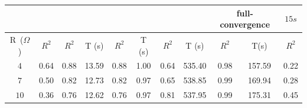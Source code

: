 \documentclass{article}
\begin{document}
\begin{table}[h!]
{\begin{tabular}{c | c | c  c | c  c | c  c | c c c}
\hline
& & & & & & & & \multicolumn{2}{c}{full-convergence} & $15s$ \\
\hline
R~($\Omega$) & $R^2$ & $R^2$ & T (s) & $R^2$ & T (s) & $R^2$ & T (s) & $R^2$ & T(s) & $R^2$ \\
\hline
$4$         &    0.64 &    0.88 & 13.59 &   0.88 & 1.00    & 0.64 & 535.40   &  0.98 & 157.59 & 0.22\\
$7$         &    0.50 &    0.82 & 12.73 &   0.82 & 0.97    & 0.65 & 538.85   &  0.99 & 169.94 & 0.28\\
$10$        &    0.36 &    0.76 & 12.62 &   0.76 & 0.97    & 0.81 & 537.95   &  0.99 & 175.31 & 0.45\\
\hline
\end{tabular}%
}


\bigskip



\end{table}
\end{document}
